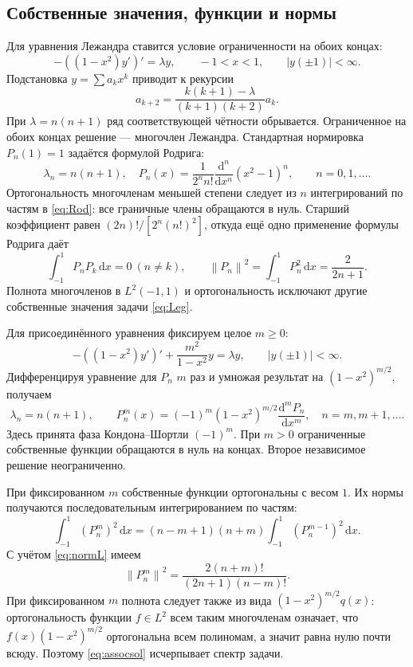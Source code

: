 \documentclass[12pt,a4paper]{article}
\newcommand{\dd}{\,\mathrm{d}}
\newcommand{\norm}[1]{\left\lVert#1\right\rVert}
\begin{document}
\subsection{Собственные значения, функции и нормы}
Для уравнения Лежандра ставится условие ограниченности на обоих концах:
\begin{equation}\label{eq:Leg}
-((1-x^2)y')'=\lambda y,\qquad -1<x<1,\qquad |y(\pm1)|<\infty.
\end{equation}
Подстановка $y=\sum a_kx^k$ приводит к рекурсии
\[
a_{k+2}=\frac{k(k+1)-\lambda}{(k+1)(k+2)}a_k.
\]
При $\lambda=n(n+1)$ ряд соответствующей чётности обрывается. Ограниченное на обоих концах решение --- многочлен Лежандра. Стандартная нормировка $P_n(1)=1$ задаётся формулой Родрига:
\begin{equation}\label{eq:Rod}
\lambda_n=n(n+1),\quad
P_n(x)=\frac1{2^nn!}\frac{\mathrm d^n}{\mathrm dx^n}(x^2-1)^n,
\qquad n=0,1,\ldots.
\end{equation}
Ортогональность многочленам меньшей степени следует из $n$ интегрирований по частям в \eqref{eq:Rod}: все граничные члены обращаются в нуль. Старший коэффициент равен $(2n)!/[2^n(n!)^2]$, откуда ещё одно применение формулы Родрига даёт
\begin{equation}\label{eq:normL}
\int_{-1}^1 P_nP_k\dd x=0\ (n\ne k),\qquad
\norm{P_n}^2=\int_{-1}^1P_n^2\dd x=\frac2{2n+1}.
\end{equation}
Полнота многочленов в $L^2(-1,1)$ и ортогональность исключают другие собственные значения задачи \eqref{eq:Leg}.

Для присоединённого уравнения фиксируем целое $m\ge0$:
\begin{equation}\label{eq:assoc}
-((1-x^2)y')'+\frac{m^2}{1-x^2}y=\lambda y,
\qquad |y(\pm1)|<\infty.
\end{equation}
Дифференцируя уравнение для $P_n$ $m$ раз и умножая результат на $(1-x^2)^{m/2}$, получаем
\begin{equation}\label{eq:assocsol}
\lambda_n=n(n+1),\qquad
P_n^m(x)=(-1)^m(1-x^2)^{m/2}\frac{\mathrm d^mP_n}{\mathrm dx^m},
\quad n=m,m+1,\ldots.
\end{equation}
Здесь принята фаза Кондона--Шортли $(-1)^m$. При $m>0$ ограниченные собственные функции обращаются в нуль на концах. Второе независимое решение неограниченно.

При фиксированном $m$ собственные функции ортогональны с весом $1$. Их нормы получаются последовательным интегрированием по частям:
\[
\int_{-1}^1(P_n^m)^2\dd x
=(n-m+1)(n+m)\int_{-1}^1(P_n^{m-1})^2\dd x.
\]
С учётом \eqref{eq:normL} имеем
\begin{equation}\label{eq:normA}
\norm{P_n^m}^2=\frac{2(n+m)!}{(2n+1)(n-m)!}.
\end{equation}
При фиксированном $m$ полнота следует также из вида $(1-x^2)^{m/2}q(x)$: ортогональность функции $f\in L^2$ всем таким многочленам означает, что $f(x)(1-x^2)^{m/2}$ ортогональна всем полиномам, а значит равна нулю почти всюду. Поэтому \eqref{eq:assocsol} исчерпывает спектр задачи.
\end{document}
